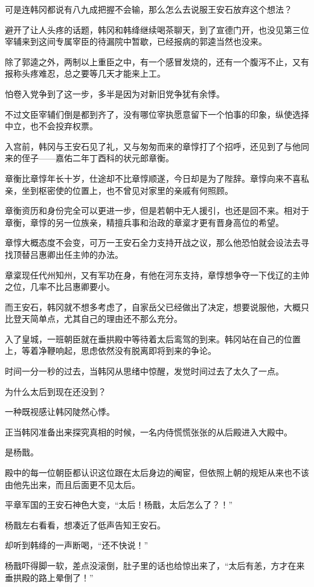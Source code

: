 可是连韩冈都说有八九成把握不会输，那么怎么去说服王安石放弃这个想法？

避开了让人头疼的话题，韩冈和韩绛继续喝茶聊天，到了宣德门开，也没见第三位宰辅来到这间专属宰臣的待漏院中暂歇，已经报病的郭逵当然也没来。

除了郭逵之外，两制以上重臣之中，有一个感冒发烧的，还有一个腹泻不止，又有报称头疼难忍，总之要等几天才能来上工。

怕卷入党争到了这一步，多半是因为对新旧党争犹有余悸。

不过文臣宰辅们倒是都到齐了，没有哪位宰执愿意留下一个怕事的印象，纵使选择中立，也不会投弃权票。

入宫前，韩冈与王安石见了礼，又与匆匆而来的章惇打了个招呼，还见到了与他同来的侄子——嘉佑二年丁酉科的状元郎章衡。

章衡比章惇年长十岁，仕途却不比章惇顺遂，今日却是为了陛辞。章惇向来不喜私亲，坐到枢密使的位置上，也不曾见对家里的亲戚有何照顾。

章衡资历和身份完全可以更进一步，但是若朝中无人援引，也还是回不来。相对于章衡，章惇的另一位族亲，精擅兵事和治政的章楶才更有晋身高位的希望。

章惇大概态度不会变，可万一王安石全力支持开战之议，那么他恐怕就会设法去寻找顶替吕惠卿出任主帅的办法。

章楶现任代州知州，又有军功在身，有他在河东支持，章惇想争夺一下伐辽的主帅之位，几率不比吕惠卿要小。

而王安石，韩冈就不想多考虑了，自家岳父已经做出了决定，想要说服他，大概只比登天简单点，尤其自己的理由还不那么充分。

入了皇城，一班朝臣就在垂拱殿中等待着太后鸾驾的到来。韩冈站在自己的位置上，等着净鞭响起，思虑依然没有脱离即将到来的争论。

时间一分一秒的过去，当韩冈从思绪中惊醒，发觉时间过去了太久了一点。

为什么太后到现在还没到？

一种既视感让韩冈陡然心悸。

正当韩冈准备出来探究真相的时候，一名内侍慌慌张张的从后殿进入大殿中。

是杨戬。

殿中的每一位朝臣都认识这位跟在太后身边的阉宦，但依照上朝的规矩从来也不该由他先出来，而且后面更不见太后。

平章军国的王安石神色大变，“太后！杨戬，太后怎么了？！”

杨戬左右看看，想凑近了低声告知王安石。

却听到韩绛的一声断喝，“还不快说！”

杨戬吓得脚一软，差点没滚倒，肚子里的话也给惊出来了，“太后有恙，方才在来垂拱殿的路上晕倒了！”

